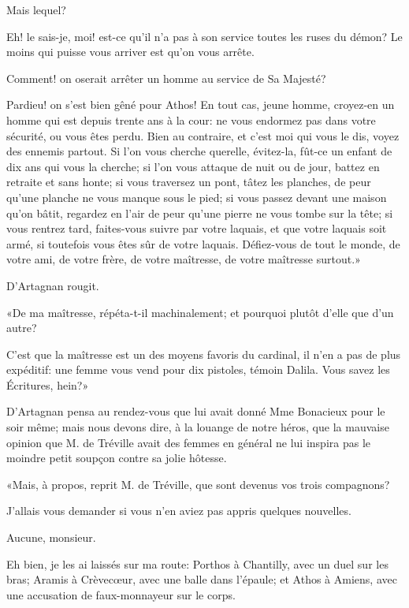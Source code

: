 \speak  Mais lequel? 

\speak  Eh! le sais-je, moi! est-ce qu'il n'a pas à son service toutes les ruses du démon? Le moins qui puisse vous arriver est qu'on vous arrête. 

\speak  Comment! on oserait arrêter un homme au service de Sa Majesté? 

\speak  Pardieu! on s'est bien gêné pour Athos! En tout cas, jeune homme, croyez-en un homme qui est depuis trente ans à la cour: ne vous endormez pas dans votre sécurité, ou vous êtes perdu. Bien au contraire, et c'est moi qui vous le dis, voyez des ennemis partout. Si l'on vous cherche querelle, évitez-la, fût-ce un enfant de dix ans qui vous la cherche; si l'on vous attaque de nuit ou de jour, battez en retraite et sans honte; si vous traversez un pont, tâtez les planches, de peur qu'une planche ne vous manque sous le pied; si vous passez devant une maison qu'on bâtit, regardez en l'air de peur qu'une pierre ne vous tombe sur la tête; si vous rentrez tard, faites-vous suivre par votre laquais, et que votre laquais soit armé, si toutefois vous êtes sûr de votre laquais. Défiez-vous de tout le monde, de votre ami, de votre frère, de votre maîtresse, de votre maîtresse surtout.» 

D'Artagnan rougit. 

«De ma maîtresse, répéta-t-il machinalement; et pourquoi plutôt d'elle que d'un autre? 

\speak  C'est que la maîtresse est un des moyens favoris du cardinal, il n'en a pas de plus expéditif: une femme vous vend pour dix pistoles, témoin Dalila. Vous savez les Écritures, hein?» 

D'Artagnan pensa au rendez-vous que lui avait donné Mme Bonacieux pour le soir même; mais nous devons dire, à la louange de notre héros, que la mauvaise opinion que M. de Tréville avait des femmes en général ne lui inspira pas le moindre petit soupçon contre sa jolie hôtesse. 

«Mais, à propos, reprit M. de Tréville, que sont devenus vos trois compagnons? 

\speak  J'allais vous demander si vous n'en aviez pas appris quelques nouvelles. 

\speak  Aucune, monsieur. 

\speak  Eh bien, je les ai laissés sur ma route: Porthos à Chantilly, avec un duel sur les bras; Aramis à Crèvecœur, avec une balle dans l'épaule; et Athos à Amiens, avec une accusation de faux-monnayeur sur le corps. 

